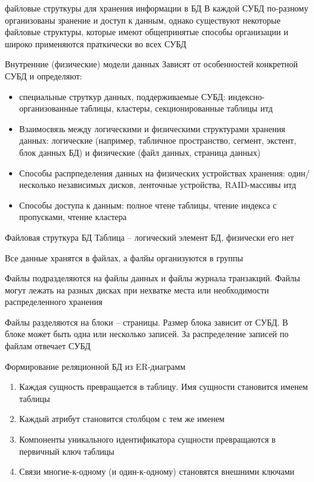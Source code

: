 \documentclass[12pt]{article}
\begin{document}
\begin{nota}{файловые струткуры для хранения информации в БД}
    В каждой СУБД по-разному организованы зранение и доступ к данным, однако существуют некоторые файловые структуры, которые имеют общепринятые способы организации и широко применяются праткически во всех СУБД 
\end{nota}

\begin{Remark}{Внутренние (физические) модели данных}
    Зависят от особенностей конкретной СУБД и определяют: 

    \begin{itemize}
        \item специальные струткур данных, поддерживаемые СУБД: индексно-организованные таблицы, кластеры, секционированные таблицы итд 
        \item Взаимосвязь между логическими и физическими структурами хранения данных: логические (например, табличное пространство, сегмент, экстент, блок данных БД) и физические (файл данных, страница данных)
        \item Способы распрпеделения данных на физических устройствах хранения: один/несколько независимых дисков, ленточные устройства, RAID-массивы итд
        \item Способы доступа к данным: полное чтене таблицы, чтение индекса с пропусками, чтение кластера 
    \end{itemize}
\end{Remark}

\begin{nota}{Файловая струткура БД}
    Таблица -- логический элемент БД, физически его нет 

    Все данные хранятся в файлах, а фалйы организуются в группы 

    Файлы подразделяются на файлы данных и файлы журнала транзакций. Файлы могут лежать на разных дисках при нехватке места или необходимости распределенного хранения 

    Файлы разделяются на блоки -- страницы. Размер блока зависит от СУБД. В блоке может быть одна или несколько записей. За распределение записей по файлам отвечает СУБД 
\end{nota}

\begin{nota}{Формирование реляционной БД из ER-диаграмм}
    \begin{enumerate}
        \item Каждая сущность превращается в таблицу. Имя сущности становится именем таблицы 
        \item Каждый атрибут становится столбцом с тем же именем 
        \item Компоненты уникального идентификатора сущности превращаются в первичный ключ таблицы 
        \item Связи многие-к-одному (и один-к-одному) становятся внешними ключами 
    \end{enumerate}
\end{nota}
\end{document}
